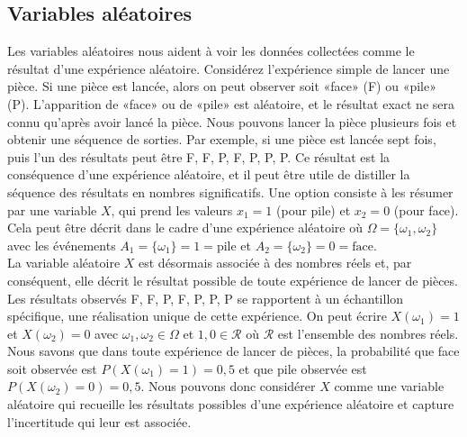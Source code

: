 \subsection{Variables aléatoires}
Les variables aléatoires nous aident à voir les données collectées comme le résultat d'une expérience aléatoire.
Considérez l'expérience simple de lancer une pièce. Si une pièce est lancée, alors on peut observer soit «face» (F)
ou «pile» (P). L'apparition de «face» ou de «pile» est aléatoire, et le résultat exact ne sera connu qu'après avoir
lancé la pièce. Nous pouvons lancer la pièce plusieurs fois et obtenir une séquence de sorties. Par exemple, si une
pièce est lancée sept fois, puis l'un des résultats peut être F, F, P, F, P, P, P. Ce résultat est la conséquence
d'une expérience aléatoire, et il peut être utile de distiller la séquence des résultats en nombres significatifs.
Une option consiste à les résumer par une variable $X$, qui prend les valeurs $x_1 = 1$ (pour pile) et $x_2 = 0$
(pour face). Cela peut être décrit dans le cadre d'une expérience aléatoire où $\Omega= \{\omega_1, \omega_2\}$ avec les événements
$A_1 = \{\omega_1\} = 1 = \text{pile}$ et $A_2 = \{\omega_2\} = 0 = \text{face}$.\\

La variable aléatoire $X$ est désormais associée à des nombres réels et, par conséquent, elle décrit le résultat possible
de toute expérience de lancer de pièces. Les résultats observés F, F, P, F, P, P, P se rapportent à un échantillon
spécifique, une réalisation unique de cette expérience. On peut écrire $X(\omega_1) = 1$ et $X(\omega_2) = 0$ avec
$\omega_1, \omega_2 \in \Omega$
et $1,0 \in \mathcal{R}$ où $\mathcal{R}$ est l'ensemble des nombres réels. Nous savons que dans toute expérience de lancer de pièces, la
probabilité que face soit observée est $P (X (\omega_1) = 1) = 0,5$ et que pile observée est
$P (X (\omega_2) = 0) = 0,5$. Nous pouvons donc considérer $X$ comme une variable aléatoire qui recueille les
résultats possibles d'une expérience aléatoire et capture l'incertitude qui leur est associée.

